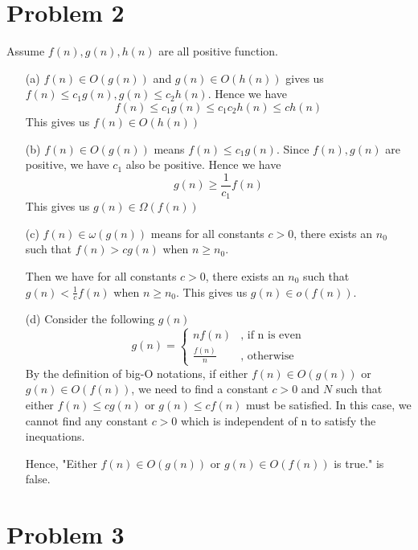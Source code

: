 \documentclass[12pt,a4paper]{article}
\begin{document}
\section*{Problem 2}    
Assume $f(n), g(n), h(n)$ are all positive function.
\begin{enumerate}
    \item[(a)]
        $f(n)\in O(g(n))$ and $g(n)\in O(h(n))$ gives us $f(n)\leq c_{1}g(n), g(n) \leq c_{2}h(n)$. Hence we have
        \[
            f(n) \leq c_{1}g(n) \leq c_{1}c_{2}h(n) \leq ch(n)
        \]
        This gives us $f(n)\in O(h(n))$
    \item[(b)]
        $f(n)\in O(g(n))$ means $f(n)\leq c_{1}g(n)$. Since $f(n), g(n)$ are positive, we have $c_{1}$ also be positive. Hence we have
        \[
            g(n) \geq \frac{1}{c_{1}} f(n)
        \]
        This gives us $g(n)\in \Omega (f(n))$
    \item[(c)]
        $f(n)\in \omega(g(n))$ means for all constants $c>0$, there exists an $n_0$ such that $f(n)>cg(n)$ when $n\geq n_0$.
        
        Then we have for all constants $c>0$, there exists an $n_0$ such that $g(n)<\frac{1}{c}f(n)$ when $n\geq n_0$. This gives us $g(n)\in o(f(n))$.
    \item[(d)]
        Consider the following $g(n)$
        \begin{equation}
            g(n) = \left\{
            \begin{aligned}
                nf(n) & \text{, if n is even} \\
                \frac{f(n)}{n} & \text{, otherwise}
            \end{aligned} 
            \right.
        \end{equation}
        By the definition of big-O notations, if either $f(n)\in O(g(n))$ or $g(n)\in O(f(n))$, we need to find a constant $c>0$ and $N$ such that either $f(n)\leq cg(n)$ or $g(n)\leq cf(n)$ must be satisfied.
        In this case, we cannot find any constant $c>0$ which is independent of n to satisfy the inequations.

        Hence, "Either $f(n)\in O(g(n))$ or $g(n)\in O(f(n))$ is true." is false.
\end{enumerate}

\section*{Problem 3}    
\end{document}

